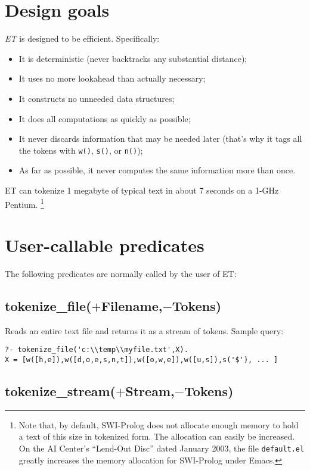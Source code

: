 \documentclass[12pt]{article}
\begin{document}
\section{Design goals}

\emph{ET} is designed to be efficient.  Specifically:
\begin{itemize}
\item It is deterministic (never backtracks any substantial distance);
\item It uses no more lookahead than actually necessary;
\item It constructs no unneeded data structures;
\item It does all computations as quickly as possible;
\item It never discards information that may be needed later
(that's why it tags all the tokens with \verb"w()", \verb"s()", or \verb"n()");
\item As far as possible, it never computes the same information more than once.
\end{itemize}

ET can tokenize 1 megabyte of typical text in about 7 seconds on a 1-GHz Pentium.%
\footnote{Note that, by default, SWI-Prolog does not allocate enough memory
to hold a text of this size in tokenized form.
The allocation can easily be increased.
On the AI Center's ``Lend-Out Disc'' dated January 2003, the file {\tt default.el}
greatly increases the memory allocation for SWI-Prolog under Emacs.}


\section{User-callable predicates}

The following predicates are normally called by the user of ET:

\subsection*{tokenize\_file($+$Filename,$-$Tokens)}

Reads an entire text file and returns it as a stream of tokens.
Sample query:
\begin{verbatim}
?- tokenize_file('c:\\temp\\myfile.txt',X).
X = [w([h,e]),w([d,o,e,s,n,t]),w([o,w,e]),w([u,s]),s('$'), ... ]
\end{verbatim}

\subsection*{tokenize\_stream($+$Stream,$-$Tokens)}
\end{document}
